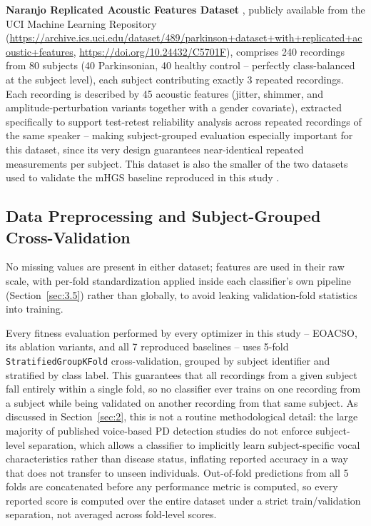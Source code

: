 \textbf{Naranjo Replicated Acoustic Features Dataset} \cite{Naranjo:2016},
publicly available from the UCI Machine Learning Repository
(\url{https://archive.ics.uci.edu/dataset/489/parkinson+dataset+with+replicated+acoustic+features},
\url{https://doi.org/10.24432/C5701F}), comprises 240 recordings from 80
subjects (40 Parkinsonian, 40 healthy control -- perfectly class-balanced
at the subject level), each subject
contributing exactly 3 repeated recordings. Each recording is described by
45 acoustic features (jitter, shimmer, and amplitude-perturbation
variants together with a gender covariate), extracted specifically to
support test-retest reliability analysis across repeated recordings of
the same speaker -- making subject-grouped evaluation especially
important for this dataset, since its very design guarantees near-identical
repeated measurements per subject. This dataset is also the smaller of
the two datasets used to validate the mHGS baseline reproduced in this
study \cite{Hashim:2023}.

\subsection{Data Preprocessing and Subject-Grouped Cross-Validation}
\label{sec:3.2}

No missing values are present in either dataset; features are used in
their raw scale, with per-fold standardization applied inside each
classifier's own pipeline (Section~\ref{sec:3.5}) rather than
globally, to avoid leaking validation-fold statistics into training.

Every fitness evaluation performed by every optimizer in this study --
EOACSO, its ablation variants, and all 7 reproduced baselines -- uses
5-fold \texttt{StratifiedGroupKFold} cross-validation, grouped by subject
identifier and stratified by class label. This guarantees that all
recordings from a given subject fall entirely within a single fold, so no
classifier ever trains on one recording from a subject while being
validated on another recording from that same subject. As discussed in
Section~\ref{sec:2}, this is not a routine methodological detail: the
large majority of published voice-based PD detection studies do not
enforce subject-level separation, which allows a classifier to
implicitly learn subject-specific vocal characteristics rather than
disease status, inflating reported accuracy in a way that does not
transfer to unseen individuals. Out-of-fold predictions from all 5 folds
are concatenated before any performance metric is computed, so every
reported score is computed over the entire dataset under a strict
train/validation separation, not averaged across fold-level scores.

